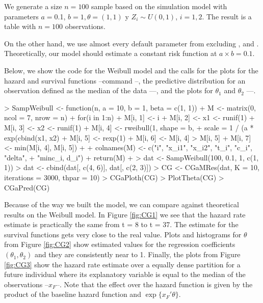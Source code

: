 \documentclass[letterpaper]{article}
\begin{document}
We generate a size $n=100$ sample based on the simulation model with parameters $a=$0.1, $b=1,\theta=(1,1)$ y $Z_i\sim U(0,1)$, $i=1,2$. The result is a table with $n=100$ observations.

On the other hand, we use almost every default parameter from  excluding ,  and . Theoretically, our model should estimate a constant risk function at $a\times b=0.1$. 

Below, we show the code for the Weibull model and the calls for the plots for the hazard and survival functions --command --, the predictive distribution for an observation defined as the median of the data ----, and the plots for $\theta_1$ and $\theta_2$ ----.

\begin{Schunk}
\begin{Sinput}
> SampWeibull <- function(n, a = 10, b = 1, beta = c(1, 1)) {
+   M <- matrix(0, ncol = 7, nrow = n)
+   for(i in 1:n){
+     M[i, 1] <- i
+     M[i, 2] <- x1 <- runif(1)
+     M[i, 3] <- x2 <- runif(1)
+     M[i, 4] <- rweibull(1, shape = b, 
+                         scale = 1 / (a * exp(cbind(x1, x2) %
+     M[i, 5] <- rexp(1)
+     M[i, 6] <- M[i, 4] > M[i, 5]
+     M[i, 7] <- min(M[i, 4], M[i, 5])
+   }
+   colnames(M) <- c("i", "x_i1", "x_i2", "t_i", "c_i", "delta",
+                    "min{c_i, d_i}")
+   return(M)
+ }
> dat <- SampWeibull(100, 0.1, 1, c(1, 1))
> dat <- cbind(dat[, c(4, 6)], dat[, c(2, 3)])
> CG <- CGaMRes(dat, K = 10, iterations = 3000, thpar = 10)
> CGaPloth(CG)
> PlotTheta(CG)
> CGaPred(CG)
\end{Sinput}
\end{Schunk}

Because of the way we built the model, we can compare against theoretical results on the Weibull model. In Figure \ref{fig:CG1} we see that the hazard rate estimate is practically the same from t = 8 to t = 37. The estimate for the survival functions gets very close to the real value. Plots and histograms for $\theta$ from Figure \ref{fig:CG2} show estimated values for the regression coefficients $(\theta_1,\theta_2)$ and they are consistently near to 1. Finally, the plots from Figure \ref{fig:CG3} show the hazard rate estimate over a equally dense partition for a future individual where its explanatory variable is equal to the median of the observations --$x_F$--. Note that the effect over the hazard function is given by the product of the baseline hazard function and $\exp\{x_F'\theta\}$.
 
\end{document}
